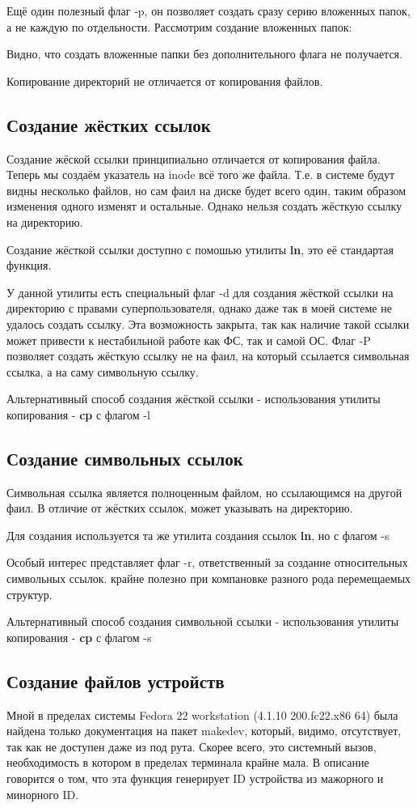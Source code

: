 \documentclass[a4paper]{article}
\begin{document}
Ещё один полезный флаг -p, он позволяет создать сразу серию вложенных папок, а не каждую по отдельности. Рассмотрим создание вложенных папок:

Видно, что создать вложенные папки без дополнительного флага не получается.

Копирование директорий не отличается от копирования файлов.
\subsection{Создание жёстких ссылок}
\label{subsec:hl}
Создание жёской ссылки принципиально отличается от копирования файла. Теперь мы создаём указатель на inode всё того же файла. Т.е. в системе будут видны несколько файлов, но сам фаил на диске будет всего один, таким образом изменения одного изменят и остальные. Однако нельзя создать жёсткую ссылку на директорию.

Создание жёсткой ссылки доступно с помошью утилиты \textbf{ln}, это её стандартая функция.

У данной утилиты есть специальный флаг -d для создания жёсткой ссылки на директорию с правами суперпользователя, однако даже так в моей системе не удалось создать ссылку. Эта возможность закрыта, так как наличие такой ссылки может привести к нестабильной работе как ФС, так и самой ОС.
Флаг -P позволяет создать жёсткую  ссылку не на фаил, на который ссылается символьная ссылка, а на саму символьную ссылку.

Альтернативный способ создания жёсткой ссылки - использования утилиты копирования - \textbf{cp} с флагом -l

\subsection{Создание символьных ссылок}
\label{subsec:sl}
Символьная ссылка является полноценным файлом, но ссылающимся на другой фаил.
В отличие от жёстких ссылок, может указывать на директорию.

Для создания используется та же утилита создания ссылок \textbf{ln}, но с флагом -s


Особый интерес представляет флаг -r, ответственный за создание относительных символьных ссылок. крайне полезно при компановке разного рода перемещаемых структур.

Альтернативный способ создания символьной ссылки - использования утилиты копирования - \textbf{cp} с флагом -s
\subsection{Создание файлов устройств}
Мной в пределах системы Fedora 22 workstation (4.1.10 200.fc22.x86 64) была найдена только документация на пакет makedev, который, видимо, отсутствует, так как не доступен даже из под рута. Скорее всего, это системный вызов, необходимость в котором в пределах терминала крайне мала. В описание говорится о том, что эта функция генерирует ID устройства из мажорного и минорного ID.
\end{document}
